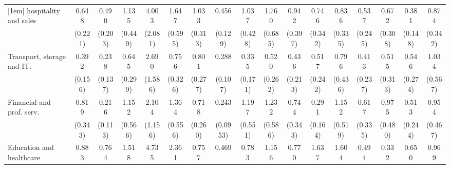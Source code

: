 {\begin{tabular}{l*{16}{c}}
[1em]
hospitality and sales&       0.648         &       0.490         &       1.135         &       4.003\sym{**} &       1.647         &       1.033         &       0.456\sym{**} &       1.037         &       1.760         &       0.942         &       0.746         &       0.836         &       0.537         &       0.672         &       0.381\sym{*}  &       0.874         \\
                    &     (0.221)         &     (0.203)         &     (0.449)         &     (2.081)         &     (0.595)         &     (0.313)         &     (0.129)         &     (0.428)         &     (0.685)         &     (0.397)         &     (0.342)         &     (0.335)         &     (0.245)         &     (0.308)         &     (0.148)         &     (0.342)         \\
[1em]
Transport, storage and IT.&       0.392\sym{*}  &       0.238\sym{*}  &       0.645         &       2.690         &       0.756         &       0.801         &       0.288\sym{***}&       0.335\sym{*}  &       0.520         &       0.436         &       0.517         &       0.796         &       0.413         &       0.515         &       0.546         &       1.034         \\
                    &     (0.156)         &     (0.137)         &     (0.299)         &     (1.586)         &     (0.326)         &     (0.277)         &     (0.107)         &     (0.171)         &     (0.262)         &     (0.213)         &     (0.242)         &     (0.436)         &     (0.237)         &     (0.313)         &     (0.274)         &     (0.567)         \\
[1em]
Financial and prof. serv.&       0.819         &       0.216\sym{**} &       1.152         &       2.104         &       1.364         &       0.718         &       0.243\sym{***}&       1.197         &       1.232         &       0.744         &       0.291\sym{*}  &       1.152         &       0.617         &       0.975         &       0.513         &       0.954         \\
                    &     (0.343)         &     (0.113)         &     (0.566)         &     (1.156)         &     (0.556)         &     (0.260)         &    (0.0953)         &     (0.551)         &     (0.586)         &     (0.343)         &     (0.164)         &     (0.519)         &     (0.335)         &     (0.480)         &     (0.244)         &     (0.467)         \\
[1em]
Education and healthcare&       0.883         &       0.764         &       1.518         &       4.735\sym{**} &       2.361\sym{*}  &       0.757         &       0.469         &       0.783         &       1.156         &       0.770         &       1.637         &       1.604         &       0.494         &       0.332\sym{*}  &       0.650         &       0.969         \\

\end{tabular}}
